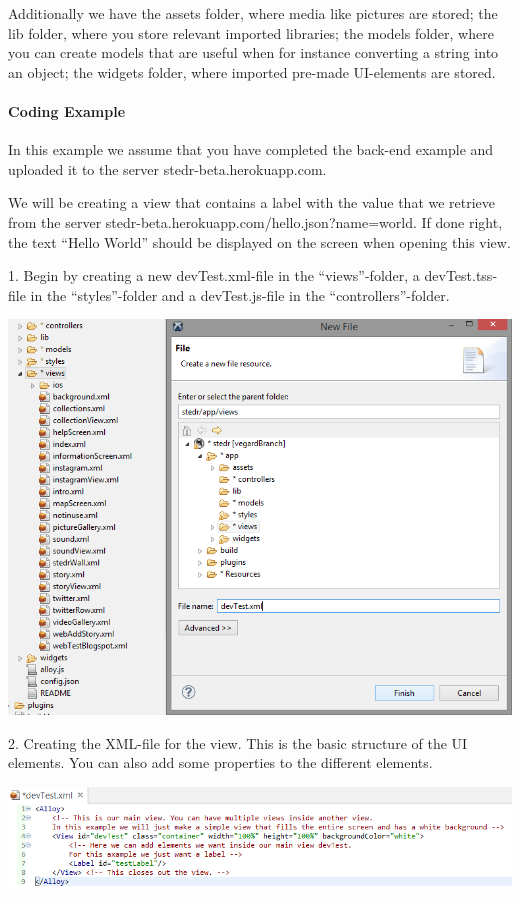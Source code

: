 Additionally we have the assets folder, where media like pictures are stored; the lib folder, where you store relevant imported libraries; the models folder, where you can create models that are useful when for instance converting a string into an object; the widgets folder, where imported pre-made UI-elements are stored.


\paragraph{Coding Example}
In this example we assume that you have completed the back-end example and uploaded it to the server stedr-beta.herokuapp.com.

We will be creating a view that contains a label with the value that we retrieve from the server stedr-beta.herokuapp.com/hello.json?name=world. If done right, the text “Hello World” should be displayed on the screen when opening this view. 

1. Begin by creating a new devTest.xml-file in the “views”-folder, a devTest.tss-file in the “styles”-folder and a devTest.js-file in the “controllers”-folder.

\begin{center}
\includegraphics[scale=0.45]{guide/f6.png} 
\end{center}

2. Creating the XML-file for the view. This is the basic structure of the UI elements. You can also add some properties to the different elements.

\begin{center}
\includegraphics[scale=0.45]{guide/f7.png} 
\end{center}

